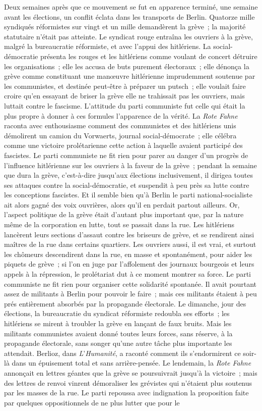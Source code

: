 \documentclass[french,twoside]{book} %
\begin{document}
Deux semaines après que ce mouvement se fut en apparence terminé, une semaine avant les élections, un conflit éclata dans les transports de Berlin. Quatorze mille syndiqués réformistes sur vingt et un mille demandèrent la grève ; la majorité statutaire n'était pas atteinte. Le syndicat rouge entraîna les ouvriers à la grève, malgré la bureaucratie réformiste, et avec l'appui des hitlériens. La social-démocratie présenta les rouges et les hitlériens comme voulant de concert détruire les organisations ; elle les accusa de buts purement électoraux ; elle dénonça la grève comme constituant une manœuvre hitlé­rienne imprudemment soutenue par les communistes, et destinée peut-être à préparer un putsch ; elle voulait faire croire qu'en essayant de briser la grève elle ne trahissait pas les ouvriers, mais luttait contre le fascisme. L'attitude du parti communiste fut celle qui était la plus propre à donner à ces formules l'apparence de la vérité. La {\itshape Rote Fahne} raconta avec enthousiasme comment des communistes et des hitlériens unis démolirent un camion du Vorwaerts, journal social-démocrate ; elle célébra comme une victoire prolétarienne cette action à laquelle avaient participé des fascistes. Le parti communiste ne fit rien pour parer au danger d'un progrès de l'influence hitlérienne sur les ouvriers à la faveur de la grève ; pendant la semaine que dura la grève, c'est-à-dire jusqu'aux élections inclusivement, il dirigea toutes ses attaques contre la social-démocratie, et suspendit à peu près sa lutte contre les conceptions fascistes. Et il semble bien qu'à Berlin le parti national-socialiste ait alors gagné des voix ouvrières, alors qu'il en perdait partout ailleurs. Or, l'aspect politique de la grève était d'autant plus important que, par la nature même de la corporation en lutte, tout se passait dans la rue. Les hitlériens lancèrent leurs sections d'assaut contre les briseurs de grève, et se rendirent ainsi maîtres de la rue dans certains quartiers. Les ouvriers aussi, il est vrai, et surtout les chômeurs descendirent dans la rue, en masse et spontanément, pour aider les piquets de grève ; si l'on en juge par l'affolement des journaux bourgeois et leurs appels à la répression, le prolétariat dut à ce moment montrer sa force. Le parti communiste ne fit rien pour organiser cette solidarité spontanée. Il avait pourtant assez de militants à Berlin pour pouvoir le faire ; mais ces militants étaient à peu prés entièrement absorbés par la propagande électorale. Le dimanche, jour des élections, la bureaucratie du syndicat réformiste redoubla ses efforts ; les hitlériens se mirent à troubler la grève en lançant de faux bruits. Mais les militants communistes avaient donné toutes leurs forces, sans réserve, à la propagande électorale, sans songer qu'une autre tâche plus importante les attendait. Berlioz, dans {\itshape L}'{\itshape Humanité}, a raconté comment ils s'endormirent ce soir-là dans un épuisement total et sans arrière-pensée. Le lendemain, la {\itshape Rote Fahne} annonçait en lettres géantes que la grève se poursui­vrait jusqu'à la victoire ; mais des lettres de renvoi vinrent démoraliser les grévistes qui n'étaient plus soutenus par les masses de la rue. Le parti repoussa avec indignation la proposition faite par quelques oppositionnels de ne plus lutter que pour le 
\end{document}
